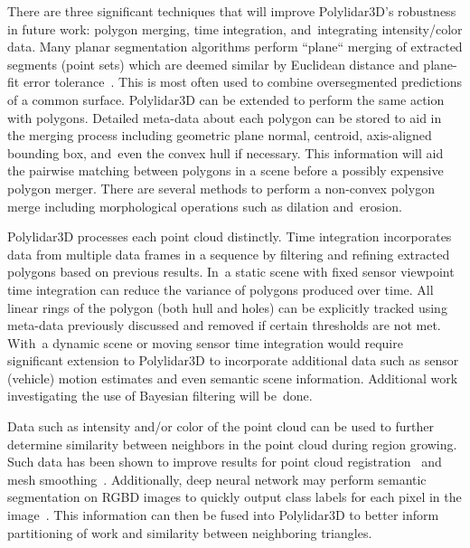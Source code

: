 There are three significant techniques that will improve Polylidar3D's robustness in future work: polygon merging, time integration, and~integrating intensity/color data. Many planar segmentation algorithms perform ``plane`` merging of extracted segments (point sets) which are deemed similar by Euclidean distance and plane-fit error tolerance~\cite{feng_fast_2014,oesau_planar_2016, trevor2013efficient, biswas_planar_2012}. This is most often used to combine oversegmented predictions of a common surface. Polylidar3D can be extended to perform the same action with polygons. Detailed meta-data about each polygon can be stored to aid in the merging process including geometric plane normal, centroid, axis-aligned bounding box, and~even the convex hull if necessary. This information will aid the pairwise matching between polygons in a scene before a possibly expensive polygon merger. There are several methods to perform a non-convex polygon merge including morphological operations such as dilation and~erosion.

Polylidar3D processes each point cloud distinctly. Time integration incorporates data from multiple data frames in a sequence by filtering and refining extracted polygons based on previous results. In~a static scene with fixed sensor viewpoint time integration can reduce the variance of polygons produced over time. All linear rings of the polygon (both hull and holes) can be explicitly tracked using meta-data previously discussed and removed if certain thresholds are not met.  With~a dynamic scene or moving sensor time integration would require significant extension to Polylidar3D to incorporate additional data such as sensor (vehicle) motion estimates and even semantic scene information. Additional work investigating the use of Bayesian filtering will be~done.

Data such as intensity and/or color of the point cloud can be used to further determine similarity between neighbors in the point cloud during region growing. Such data has been shown to improve results for point cloud registration~\cite{rusinkiewicz_efficient_2001} and mesh smoothing~\cite{lee_fast_2013}. Additionally, deep neural network may perform semantic segmentation on RGBD images to quickly output class labels for each pixel in the image~\cite{pham_scenecut_2018}. This information can then be fused into Polylidar3D to better inform partitioning of work and similarity between neighboring triangles.

